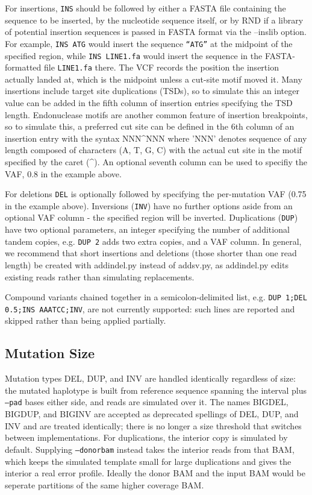 \documentclass[letterpaper,11pt]{article}
\begin{document}
    For insertions, \texttt{INS} should be followed by either a FASTA file containing the sequence to be inserted, by the nucleotide sequence itself, or by RND if a library of potential insertion sequences is passed in FASTA format via the --inslib option. For example, \texttt{INS ATG} would insert the sequence \texttt{``ATG''} at the midpoint of the specified region, while \texttt{INS LINE1.fa} would insert the sequence in the FASTA-formatted file \texttt{LINE1.fa} there. The VCF records the position the insertion actually landed at, which is the midpoint unless a cut-site motif moved it. Many insertions include target site duplications (TSDs), so to simulate this an integer value can be added in the fifth column of insertion entries specifying the TSD length. Endonuclease motifs are another common feature of insertion breakpoints, so to simulate this, a preferred cut site can be defined in the 6th column of an insertion entry with the syntax NNN\^{}NNN where 'NNN' denotes sequence of any length composed of characters (A, T, G, C) with the actual cut site in the motif specified by the caret (\^{}). An optional seventh column can be used to specifiy the VAF, 0.8 in the example above.
    
    For deletions  \texttt{DEL} is optionally followed by specifying the per-mutation VAF (0.75 in the example above). Inversions (\texttt{INV}) have no further options aside from an optional VAF column - the specified region will be inverted. Duplications (\texttt{DUP}) have two optional parameters, an integer specifying the number of additional tandem copies, e.g. \texttt{DUP 2} adds two extra copies, and a VAF column. In general, we recommend that short insertions and deletions (those shorter than one read length) be created with addindel.py instead of addsv.py, as addindel.py edits existing reads rather than simulating replacements.

    Compound variants chained together in a semicolon-delimited list, e.g. \texttt{DUP 1;DEL 0.5;INS AAATCC;INV}, are not currently supported: such lines are reported and skipped rather than being applied partially.

\subsection{Mutation Size}
Mutation types DEL, DUP, and INV are handled identically regardless of size: the mutated haplotype is built from reference sequence spanning the interval plus \texttt{--pad} bases either side, and reads are simulated over it. The names BIGDEL, BIGDUP, and BIGINV are accepted as deprecated spellings of DEL, DUP, and INV and are treated identically; there is no longer a size threshold that switches between implementations. For duplications, the interior copy is simulated by default. Supplying \texttt{--donorbam} instead takes the interior reads from that BAM, which keeps the simulated template small for large duplications and gives the interior a real error profile. Ideally the donor BAM and the input BAM would be seperate partitions of the same higher coverage BAM.
\end{document}
